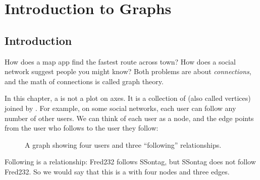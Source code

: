 \chapter{Introduction to Graphs}

\section{Introduction}

How does a map app find the fastest route across town? How does a social
network suggest people you might know? Both problems are about
\emph{connections}, and the math of connections is called graph theory.

In this chapter, a  is not a plot on axes. It is a
collection of  (also called vertices) joined by
. For example, on some social networks, each
user can follow any number of other users. We
can think of each user as a node, and the edge points from the user who
follows to the user they follow:

\begin{figure}[H]
  \centering
  \caption{A graph showing four users and three ``following'' relationships.}
  \label{fig:following}
\end{figure}

Following is a  relationship: Fred232 follows SSontag, but SSontag does not
follow Fred232. So we would say that this is a 
with four nodes and three edges.

